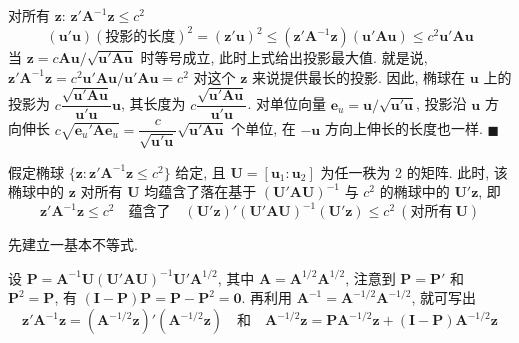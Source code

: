 对所有 $\mathbf{z}$: $\mathbf{z}'\mathbf{A}^{-1}\mathbf{z}\le c^2$
\[
(\mathbf{u}'\mathbf{u})(\text{投影的长度})^2=(\mathbf{z}'\mathbf{u})^2\le(\mathbf{z}'\mathbf{A}^{-1}\mathbf{z})(\mathbf{u}'\mathbf{A}\mathbf{u})\le c^2\mathbf{u}'\mathbf{A}\mathbf{u}
\]
当 $\mathbf{z}=c\mathbf{A}\mathbf{u}/\sqrt{\mathbf{u}'\mathbf{A}\mathbf{u}}$ 时等号成立, 此时上式给出投影最大值. 就是说, $\mathbf{z}'\mathbf{A}^{-1}\mathbf{z}=c^2\mathbf{u}'\mathbf{A}\mathbf{u}/\mathbf{u}'\mathbf{A}\mathbf{u}=c^2$ 对这个 $\mathbf{z}$ 来说提供最长的投影. 因此, 椭球在 $\mathbf{u}$ 上的投影为 $c\dfrac{\sqrt{\mathbf{u}'\mathbf{A}\mathbf{u}}}{\mathbf{u}'\mathbf{u}}\mathbf{u}$, 其长度为 $c\dfrac{\sqrt{\mathbf{u}'\mathbf{A}\mathbf{u}}}{\mathbf{u}'\mathbf{u}}$. 对单位向量 $\mathbf{e}_u=\mathbf{u}/\sqrt{\mathbf{u}'\mathbf{u}}$, 投影沿 $\mathbf{u}$ 方向伸长 $c\sqrt{\mathbf{e}_u'\mathbf{A}\mathbf{e}_u}=\dfrac{c}{\sqrt{\mathbf{u}'\mathbf{u}}}\sqrt{\mathbf{u}'\mathbf{A}\mathbf{u}}$ 个单位, 在 $-\mathbf{u}$ 方向上伸长的长度也一样. \hfill$\blacksquare$

 假定椭球 $\{\mathbf{z}:\mathbf{z}'\mathbf{A}^{-1}\mathbf{z}\le c^2\}$ 给定, 且 $\mathbf{U}=[\mathbf{u}_1:\mathbf{u}_2]$ 为任一秩为 2 的矩阵. 此时, 该椭球中的 $\mathbf{z}$ 对所有 $\mathbf{U}$ 均蕴含了落在基于 $(\mathbf{U}'\mathbf{A}\mathbf{U})^{-1}$ 与 $c^2$ 的椭球中的 $\mathbf{U}'\mathbf{z}$, 即
\[
\mathbf{z}'\mathbf{A}^{-1}\mathbf{z}\le c^2 \quad\text{蕴含了}\quad
(\mathbf{U}'\mathbf{z})'(\mathbf{U}'\mathbf{A}\mathbf{U})^{-1}(\mathbf{U}'\mathbf{z})\le c^2\ (\text{对所有}\ \mathbf{U})
\]

\quad 先建立一基本不等式.

设 $\mathbf{P}=\mathbf{A}^{-1}\mathbf{U}(\mathbf{U}'\mathbf{A}\mathbf{U})^{-1}\mathbf{U}'\mathbf{A}^{1/2}$, 其中 $\mathbf{A}=\mathbf{A}^{1/2}\mathbf{A}^{1/2}$, 注意到 $\mathbf{P}=\mathbf{P}'$ 和 $\mathbf{P}^2=\mathbf{P}$, 有 $(\mathbf{I}-\mathbf{P})\mathbf{P}=\mathbf{P}-\mathbf{P}^2=\mathbf{0}$. 再利用 $\mathbf{A}^{-1}=\mathbf{A}^{-1/2}\mathbf{A}^{-1/2}$, 就可写出
\[
\mathbf{z}'\mathbf{A}^{-1}\mathbf{z}=(\mathbf{A}^{-1/2}\mathbf{z})'(\mathbf{A}^{-1/2}\mathbf{z})
\quad\text{和}\quad
\mathbf{A}^{-1/2}\mathbf{z}=\mathbf{P}\mathbf{A}^{-1/2}\mathbf{z}+(\mathbf{I}-\mathbf{P})\mathbf{A}^{-1/2}\mathbf{z}
\]
